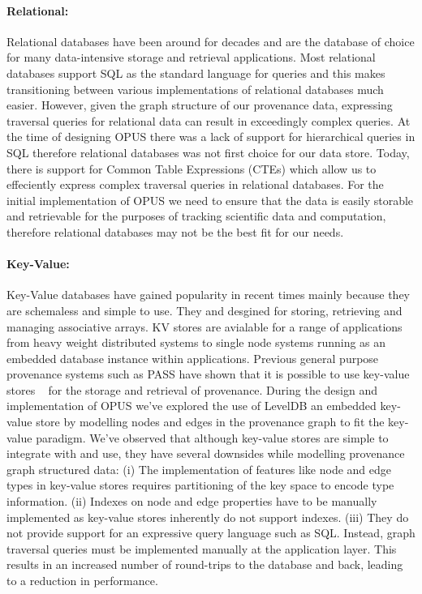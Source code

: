 \documentclass[withindex,glossary]{cam-thesis}
\begin{document}
\paragraph{Relational:} 
Relational databases have been around for decades and are the database of choice for many data-intensive storage and retrieval applications.
Most relational databases support SQL as the standard language for queries and this makes transitioning between various implementations of relational databases much easier.
However, given the graph structure of our provenance data, expressing traversal queries for relational data can result in exceedingly complex queries.
At the time of designing OPUS there was a lack of support for hierarchical queries in SQL therefore relational databases was not first choice for our data store.
Today, there is support for Common Table Expressions (CTEs) which allow us to effeciently express complex traversal queries in relational databases.
For the initial implementation of OPUS we need to ensure that the data is easily storable and retrievable for the purposes of tracking scientific data and computation, therefore relational databases may not be the best fit for our needs.

\paragraph{Key-Value:}
Key-Value databases have gained popularity in recent times mainly because they are schemaless and simple to use. They and desgined for storing, retrieving and managing associative arrays.
KV stores are avialable for a range of applications from heavy weight distributed systems to single node systems running as an embedded database instance within applications.
Previous general purpose provenance systems such as PASS have shown that it is possible to use key-value stores ~\cite{BerkleyDB} for the storage and retrieval of provenance.
During the design and implementation of OPUS we've explored the use of LevelDB an embedded key-value store by modelling nodes and edges in the provenance graph to fit the key-value paradigm.
We've observed that although key-value stores are simple to integrate with and use, they have several downsides while modelling provenance graph structured data:
(i) The implementation of features like node and edge types in key-value stores requires partitioning of the key space to encode type information.
(ii) Indexes on node and edge properties have to be manually implemented as key-value stores inherently do not support indexes.
(iii) They do not provide support for an expressive query language such as SQL. Instead, graph traversal queries must be implemented manually at the application layer. This results in an increased number of round-trips to the database and back, leading to a reduction in performance.
\end{document}
